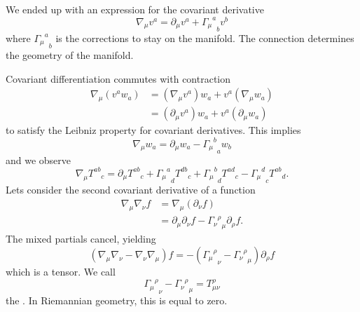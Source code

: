 We ended up with an expression for the covariant derivative
\begin{equation}
\nabla_{\mu}v^{a}=\partial_{\mu}v^{a}+
{{\Gamma_{\mu}}^{a}}_{b}v^{b}
\end{equation}
where ${{\Gamma_{\mu}}^{a}}_{b}$ is the corrections to stay on
the manifold. The connection determines the geometry of the
manifold. 

Covariant differentiation commutes with contraction
\begin{equation}
\begin{split}
\nabla_{\mu}(v^{a}w_{a})
&=(\nabla_{\mu}v^{a})w_{a}+v^{a}(\nabla_{\mu}w_{a})\\
&=(\partial_{\mu}v^{a})w_{a}+v^{a}(\partial_{\mu}w_{a})
\end{split}
\end{equation}
to satisfy the Leibniz property for covariant derivatives. This
implies
\begin{equation}
\nabla_{\mu}w_{a}=\partial_{\mu}w_{a}-{{\Gamma_{\mu}}^{b}}_{a}w_{b}
\end{equation}
and we observe
\begin{equation}
\nabla_{\mu}{T^{ab}}_{c}
=
\partial_{\mu}{T^{ab}}_{c}+
{{\Gamma_{\mu}}^{a}}_{d}{T^{db}}_{c}+
{{\Gamma_{\mu}}^{b}}_{d}{T^{ad}}_{c}-
{{\Gamma_{\mu}}^{d}}_{c}{T^{ab}}_{d}.
\end{equation}
Lets consider the second covariant derivative of a function
\begin{equation}
\begin{split}
\nabla_{\mu}\nabla_{\nu}f
&= \nabla_{\mu}(\partial_{\nu}f)\\
&=
\partial_{\mu}\partial_{\nu}f-{{\Gamma_{\nu}}^{\rho}}_{\mu}\partial_{\rho}f. 
\end{split}
\end{equation}
The mixed partials cancel, yielding
\begin{equation}
(\nabla_{\mu}\nabla_{\nu}-\nabla_{\nu}\nabla_{\mu})f
=-({{\Gamma_{\mu}}^{\rho}}_{\nu}-{{\Gamma_{\nu}}^{\rho}}_{\mu})\partial_{\rho}f
\end{equation}
which is a tensor. We call
\begin{equation}
{{\Gamma_{\mu}}^{\rho}}_{\nu}-{{\Gamma_{\nu}}^{\rho}}_{\mu}=T^{\rho}_{\mu\nu}
\end{equation}
the . In Riemannian geometry, this is
equal to zero.


